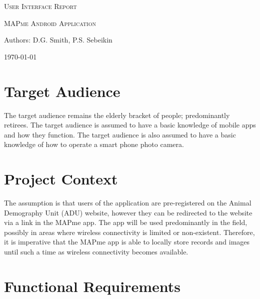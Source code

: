 \documentclass[12pt,a4paper,oneside]{report}
\begin{document}
\begin{titlepage}
	\centering
	{\scshape\LARGE User Interface Report \par}
	\vspace{1cm}
	{\scshape\Large MAPme Android Application\par}
	\vspace{1.5cm}
	{\LARGE Authors: D.G. Smith, P.S. Sebeikin\par}
	\vspace{2cm}
	{\large \today\par}
\end{titlepage}
\tableofcontents
\pagebreak

\section{Target Audience}
The target audience remains the elderly bracket of people; predominantly retirees.  The target audience is assumed to have a basic knowledge of mobile apps and how they function.  The target audience is also assumed to have a basic knowledge of how to operate a smart phone photo camera.

\section{Project Context}
The assumption is that users of the application are pre-registered on the Animal Demography Unit (ADU) website, however they can be redirected to the website via a link in the MAPme app.  The app will be used predominantly in the field, possibly in areas where wireless connectivity is limited or non-existent.  Therefore, it is imperative that the MAPme app is able to locally store records and images until such a time as wireless connectivity becomes available.

\section{Functional Requirements}
\end{document}
